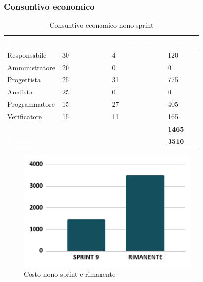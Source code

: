 \newpage
\subsubsection{Consuntivo economico}
{
\setlength{\tabcolsep}{10pt}
\renewcommand{\arraystretch}{1.5}
\begin{table}[h]
    \centering
    \begin{tabularx}{\textwidth}{| l | l | l | X |}
        \hline
        \rowcolor{headerrow} \textbf{\textcolor{white}{Ruolo}} & \textbf{\textcolor{white}{Costo orario}} & \textbf{\textcolor{white}{Ore impiegate}} & \textbf{\textcolor{white}{Costo €}} \\
        \hline
        Responsabile & 30 & 4 & 120\\
        \hline
        Amministratore & 20 & 0 & 0\\
        \hline
        Progettista & 25 & 31 & 775\\
        \hline
        Analista & 25 & 0 & 0\\
        \hline
        Programmatore & 15 & 27 & 405\\
        \hline
        Verificatore & 15 & 11 & 165\\
        \hline
        \cellcolor{headerrow} \textbf{\textcolor{white}{Totale}} &  &  & \textbf{1465}\\
        \hline
        \cellcolor{headerrow} \textbf{\textcolor{white}{Rimanente}} &  &  & \textbf{3510}\\
        \hline
    \end{tabularx}
    \caption{Consuntivo economico nono sprint}
    \label{tab:consuntivocostinonosprint}
\end{table}
}

\begin{figure}[h!]
    \centering
    \includegraphics[width=0.8\textwidth]{cons9costo.png}
    \caption{Costo nono sprint e rimanente}
    \label{fig:consuntivocostononosprint}
\end{figure}

